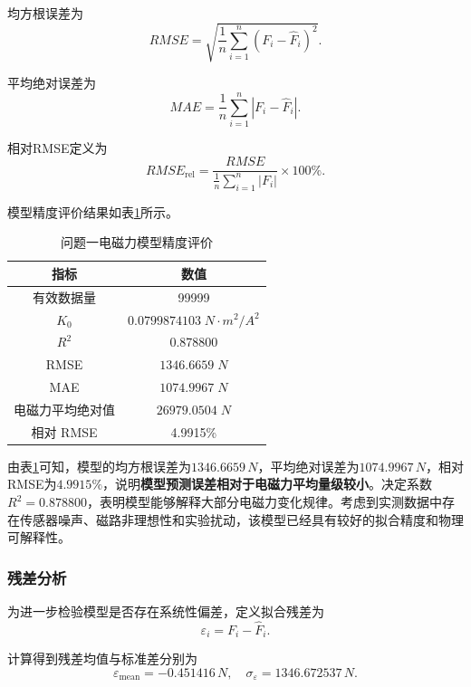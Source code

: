 \documentclass[a4paper]{nmmcm}
\begin{document}
均方根误差为
\begin{equation}
RMSE=\sqrt{\frac{1}{n}\sum_{i=1}^{n}(F_i-\hat{F}_i)^2}.
\end{equation}

平均绝对误差为
\begin{equation}
MAE=\frac{1}{n}\sum_{i=1}^{n}|F_i-\hat{F}_i|.
\end{equation}

相对RMSE定义为
\begin{equation}
RMSE_{\text{rel}}=\frac{RMSE}{\frac{1}{n}\sum_{i=1}^{n}|F_i|}\times100\%.
\end{equation}

模型精度评价结果如表\ref{tab:problem1_accuracy}所示。

\FloatBarrier
\begin{table}[H]
\centering
\caption{问题一电磁力模型精度评价}
\label{tab:problem1_accuracy}
\begin{tabular}{c c}
\hline
指标 & 数值 \\
\hline
有效数据量 & 99999 \\
$K_0$ & $0.0799874103\;N\cdot m^2/A^2$ \\
$R^2$ & 0.878800 \\
RMSE & $1346.6659\;N$ \\
MAE & $1074.9967\;N$ \\
电磁力平均绝对值 & $26979.0504\;N$ \\
相对 RMSE & 4.9915\% \\
\hline
\end{tabular}
\end{table}
\FloatBarrier

由表\ref{tab:problem1_accuracy}可知，模型的均方根误差为$1346.6659\,N$，平均绝对误差为$1074.9967\,N$，相对RMSE为$4.9915\%$，说明\textbf{模型预测误差相对于电磁力平均量级较小}。决定系数$R^2=0.878800$，表明模型能够解释大部分电磁力变化规律。考虑到实测数据中存在传感器噪声、磁路非理想性和实验扰动，该模型已经具有较好的拟合精度和物理可解释性。

\subsubsection{残差分析}

为进一步检验模型是否存在系统性偏差，定义拟合残差为
\begin{equation}
\varepsilon_i=F_i-\hat{F}_i.
\end{equation}

计算得到残差均值与标准差分别为
\[
\varepsilon_{\text{mean}}=-0.451416\,N,\quad \sigma_{\varepsilon}=1346.672537\,N.
\]
\end{document}
